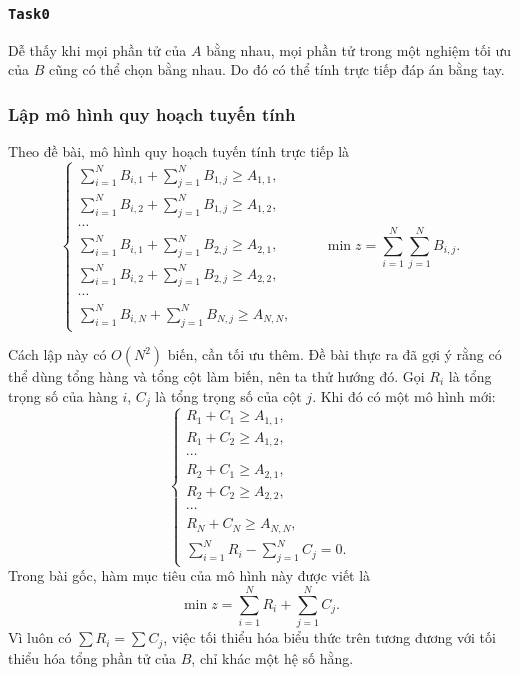 \documentclass[11pt]{article}
\begin{document}
\subsubsection{\texttt{Task0}}

Dễ thấy khi mọi phần tử của \(A\) bằng nhau, mọi phần tử trong một nghiệm tối ưu
của \(B\) cũng có thể chọn bằng nhau. Do đó có thể tính trực tiếp đáp án bằng
tay.

\subsubsection{Lập mô hình quy hoạch tuyến tính}

Theo đề bài, mô hình quy hoạch tuyến tính trực tiếp là
\[
\begin{cases}
\sum_{i=1}^{N} B_{i,1}+\sum_{j=1}^{N}B_{1,j}\ge A_{1,1},\\
\sum_{i=1}^{N} B_{i,2}+\sum_{j=1}^{N}B_{1,j}\ge A_{1,2},\\
\cdots\\
\sum_{i=1}^{N} B_{i,1}+\sum_{j=1}^{N}B_{2,j}\ge A_{2,1},\\
\sum_{i=1}^{N} B_{i,2}+\sum_{j=1}^{N}B_{2,j}\ge A_{2,2},\\
\cdots\\
\sum_{i=1}^{N} B_{i,N}+\sum_{j=1}^{N}B_{N,j}\ge A_{N,N},
\end{cases}
\qquad
\min z=\sum_{i=1}^{N}\sum_{j=1}^{N}B_{i,j}.
\]

Cách lập này có \(O(N^2)\) biến, cần tối ưu thêm. Đề bài thực ra đã gợi ý rằng
có thể dùng tổng hàng và tổng cột làm biến, nên ta thử hướng đó. Gọi \(R_i\) là
tổng trọng số của hàng \(i\), \(C_j\) là tổng trọng số của cột \(j\). Khi đó có
một mô hình mới:
\[
\begin{cases}
R_1+C_1\ge A_{1,1},\\
R_1+C_2\ge A_{1,2},\\
\cdots\\
R_2+C_1\ge A_{2,1},\\
R_2+C_2\ge A_{2,2},\\
\cdots\\
R_N+C_N\ge A_{N,N},\\
\sum_{i=1}^{N}R_i-\sum_{j=1}^{N}C_j=0.
\end{cases}
\]
Trong bài gốc, hàm mục tiêu của mô hình này được viết là
\[
  \min z=\sum_{i=1}^{N}R_i+\sum_{j=1}^{N}C_j.
\]
Vì luôn có \(\sum R_i=\sum C_j\), việc tối thiểu hóa biểu thức trên tương đương
với tối thiểu hóa tổng phần tử của \(B\), chỉ khác một hệ số hằng.
\end{document}
